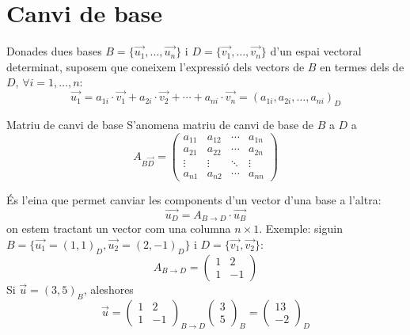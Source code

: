 \documentclass{beamer}
\begin{document}
\section{Canvi de base}
\begin{frame}
  Donades dues bases $B=\{\overrightarrow{u_1},\ldots,\overrightarrow{u_n}\}$ i
  $D=\{\overrightarrow{v_1},\ldots,\overrightarrow{v_n}\}$ d'un espai vectoral determinat, suposem que coneixem l'expressió dels vectors de $B$ en termes dels de $D$, $\forall i = 1,\ldots,n$:
  \[
    \overrightarrow{u_1}= a_{1i}\cdot \overrightarrow{v_1}+
                          a_{2i}\cdot \overrightarrow{v_2}+\cdots+
                          a_{ni}\cdot \overrightarrow{v_n}
                        = (a_{1i},a_{2i},\ldots,a_{ni})_D
  \]
  \begin{block}{Matriu de canvi de base}
    S'anomena matriu de canvi de base de $B$ a $D$ a
    \[
      A_{B\overrightarrow D}=
      \begin{pmatrix}
        a_{11} & a_{12} & \cdots & a_{1n}\\
        a_{21} & a_{22} & \cdots & a_{2n}\\
        \vdots & \vdots & \ddots & \vdots\\
        a_{n1} & a_{n2} & \cdots & a_{nn}
      \end{pmatrix}
    \]
  \end{block}

\end{frame}
\begin{frame}
  És l'eina que permet canviar les components d'un vector d'una base a l'altra:
  \[
    \overrightarrow{u_D}= A_{B \rightarrow D} \cdot \overrightarrow{u_B}
  \]
  on estem tractant un vector com una columna $n \times 1$.
  Exemple: siguin $B=\{\overrightarrow{u_1}=(1,1)_D,\overrightarrow{u_2}=(2,-1)_D\}$ i $D=\{\overrightarrow{v_1},\overrightarrow{v_2}\}$:
  \[
    A_{B \rightarrow D} = \begin{pmatrix}1&2\\1&-1\end{pmatrix}
  \]
  Si $\overrightarrow{u} = (3,5)_B$, aleshores
  \[
    \overrightarrow{u} = \begin{pmatrix}1&2\\1&-1\end{pmatrix}_{B \rightarrow D} \begin{pmatrix}3\\5\end{pmatrix}_B = \begin{pmatrix}13\\-2\end{pmatrix}_D
  \]
\end{frame}
\end{document}
